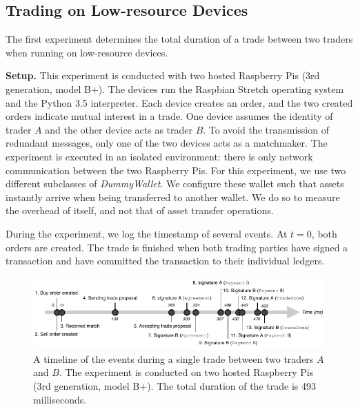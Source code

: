\subsection{Trading on Low-resource Devices}
\label{sec:exp_trading_low_devices}
The first experiment determines the total duration of a trade between two traders when running \ModelName{} on low-resource devices.

\textbf{Setup.}
This experiment is conducted with two hosted Raspberry Pis (3rd generation, model B+).
The devices run the Raspbian Stretch operating system and the Python 3.5 interpreter.
Each device creates an order, and the two created orders indicate mutual interest in a trade.
One device assumes the identity of trader $ A $ and the other device acts as trader $ B $.
To avoid the transmission of redundant \MsgMatch{} messages, only one of the two devices acts as a matchmaker.
The experiment is executed in an isolated environment: there is only network communication between the two Raspberry Pis.
For this experiment, we use two different subclasses of \emph{DummyWallet}.
We configure these wallet such that assets instantly arrive when being transferred to another wallet.
We do so to measure the overhead of \ModelName{} itself, and not that of asset transfer operations.

During the experiment, we log the timestamp of several events. %
At $ t=0 $, both orders are created.
The trade is finished when both trading parties have signed a \TRTradeDone{} transaction and have committed the transaction to their individual ledgers.

\begin{figure}[t]
	\centering
	\includegraphics[width=\linewidth]{xchange/assets/trade_timeline}
	\caption{A timeline of the events during a single trade between two traders $ A $ and $ B $. The experiment is conducted on two hosted Raspberry Pis (3rd generation, model B+). The total duration of the trade is 493 milliseconds.}
	\label{fig:trade_timeline}
\end{figure}

